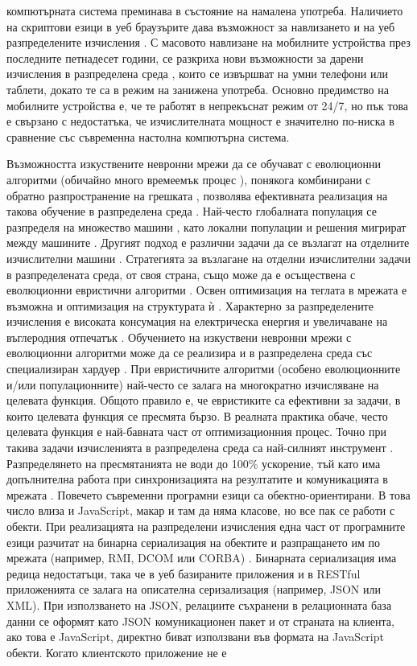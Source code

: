 компютърната система преминава в състояние на намалена употреба. Наличието на скриптови езици \cite{Rivas-01} в уеб браузърите дава възможност за навлизането и на уеб разпределените изчисления \cite{Duda-01}. С масовото навлизане на мобилните устройства през последните петнадесет години, се разкриха нови възможности за дарени изчисления в разпределена среда \cite{Gong-01}, които се извършват на умни телефони или таблети, докато те са в режим на занижена употреба. Основно предимство на мобилните устройства е, че те работят в непрекъснат режим от 24/7, но пък това е свързано с недостатъка, че изчислителната мощност е значително по-ниска в сравнение със съвременна настолна компютърна система. 

Възможността изкуствените невронни мрежи да се обучават с еволюционни алгоритми \cite{Desell-03} (обичайно много времеемък процес \cite{Guo-01}), понякога комбинирани с обратно разпространение на грешката \cite{Zhu-01}, позволява ефективната реализация на такова обучение в разпределена среда \cite{Pandey-01}. Най-често глобалната популация се разпределя на множество машини \cite{Plagianakos-01}, като локални популации и решения мигрират между машините \cite{Tan-01}. Другият подход е различни задачи да се възлагат на отделните изчислителни машини \cite{Altinoz-01}. Стратегията за възлагане на отделни изчислителни задачи \cite{Ahmad-01} в разпределената среда, от своя страна, също може да е осъществена с еволюционни евристични алгоритми \cite{Sharma-01}. Освен оптимизация на теглата в мрежата е възможна и оптимизация на структурата ѝ \cite{Desell-01}. Характерно за разпределените изчисления е високата консумация на електрическа енергия \cite{Foo-01} и увеличаване на въглеродния отпечатък \cite{Kumar-01}. Обучението на изкуствени невронни мрежи с еволюционни алгоритми може да се реализира и в разпределена среда със специализиран хардуер \cite{Epitropakis-01}. При евристичните алгоритми (особено еволюционните и/или популационните) най-често се залага на многократно изчисляване на целевата функция. Общото правило е, че евристиките са ефективни за задачи, в които целевата функция се пресмята бързо. В реалната практика обаче, често целевата функция е най-бавната част от оптимизационния процес. Точно при такива задачи изчисленията в разпределена среда са най-силният инструмент \cite{Liu-01}. Разпределянето на пресмятанията не води до 100\% ускорение, тъй като има допълнителна работа при синхронизацията на резултатите и комуникацията в мрежата \cite{Gong-01}. Повечето съвременни програмни езици са обектно-ориентирани. В това число влиза и JavaScript, макар и там да няма класове, но все пак се работи с обекти. При реализацията на разпределени изчисления една част от програмните езици разчитат на бинарна сериализация на обектите и разпращането им по мрежата (например, RMI, DCOM или CORBA) \cite{Ding-02}. Бинарната сериализация има редица недостатъци, така че в уеб базираните приложения и в RESTful приложенията се залага на описателна серизализация (например, JSON или XML). При използването на JSON, релациите съхранени в релационната база данни се оформят като JSON комуникационен пакет и от страната на клиента, ако това е JavaScript, директно биват използвани във формата на JavaScript обекти. Когато клиентското приложение не е 